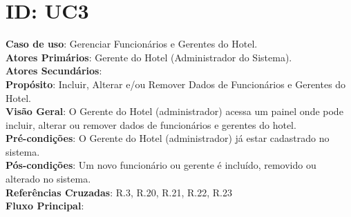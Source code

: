 \documentclass[notitlepage]{article}
\begin{document}
\clearpage

\section{ID: UC3}
\noindent\textbf{Caso de uso}: Gerenciar Funcionários e Gerentes do Hotel.\\
\textbf{Atores Primários}: Gerente do Hotel (Administrador do Sistema). \\
\textbf{Atores Secundários}: \\
\textbf{Propósito}: Incluir, Alterar e/ou Remover Dados de Funcionários e Gerentes do Hotel.\\
\textbf{Visão Geral}: O Gerente do Hotel (administrador) acessa um painel onde pode incluir, alterar ou remover dados de funcionários e gerentes do hotel.\\
\textbf{Pré-condições}: O Gerente do Hotel (administrador) já estar cadastrado no sistema.\\
\textbf{Pós-condições}: Um novo funcionário ou gerente é incluído, removido ou alterado no sistema.\\
\textbf{Referências Cruzadas}: R.3, R.20, R.21, R.22, R.23\\
\newline
\textbf{Fluxo Principal}:\\
\end{document}
